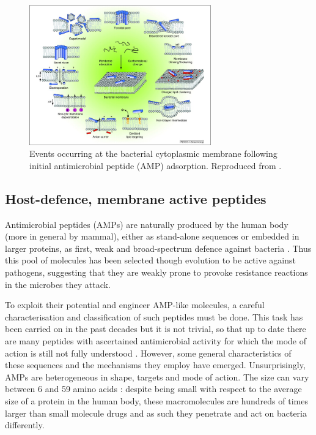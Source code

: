 \begin{figure}
\begin{center}
\includegraphics[width = 0.7\textwidth]{pics/amp_mech.jpg}
\caption[Antimicrobial peptides]{Events occurring at the bacterial cytoplasmic membrane following initial antimicrobial peptide (AMP) adsorption. Reproduced from \cite{Nguyen2011}.} \label{fig:amp}
\end{center}
\end{figure}


\subsection{Host-defence, membrane active peptides} \label{sec:host-defense-peptides}
Antimicrobial peptides (AMPs) are naturally produced by the human body (more in general by mammal), either as stand-alone sequences or embedded in larger proteins, as first, weak and broad-spectrum defence against bacteria \cite{Nguyen2011,Bahar2013,Mahlapuu2016,Zhang2016}.
%
Thus this pool of molecules has been selected though evolution to be active against pathogens, suggesting that they are weakly prone to provoke resistance reactions in the microbes they attack.

To exploit their potential and engineer AMP-like molecules, a careful characterisation and classification of such peptides must be done. This task has been carried on in the past decades but it is not trivial, so that up to date there are many peptides with ascertained antimicrobial activity for which the mode of action is still not fully understood \cite{Ebbensgaard2015}. However, some general characteristics of these sequences and the mechanisms they employ have emerged.
%
Unsurprisingly, AMPs are heterogeneous in shape, targets and mode of action. The size can vary between 6 and 59 amino acids \cite{Brogden2005}: despite being small with respect to the average size of a protein in the human body, these macromolecules are hundreds of times larger than small molecule drugs and as such they penetrate and act on bacteria differently.

